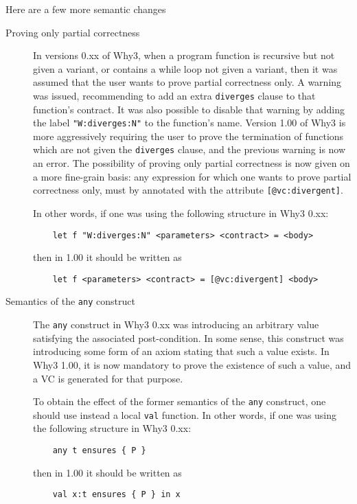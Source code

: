 \documentclass[a4paper,11pt,twoside,openright]{memoir}
\begin{document}
Here are a few more semantic changes
\begin{description}
\item[Proving only partial correctness] In versions 0.xx of Why3, when
  a program function is recursive but not given a variant, or contains
  a while loop not given a variant, then it was assumed that the user
  wants to prove partial correctness only. A warning was issued,
  recommending to add an extra \verb|diverges| clause to that
  function's contract. It was also possible to disable that warning by
  adding the label \verb|"W:diverges:N"| to the function's
  name. Version 1.00 of Why3 is more aggressively requiring the user
  to prove the termination of functions which are not given the
  \verb|diverges| clause, and the previous warning is now an
  error. The possibility of proving only partial correctness is now
  given on a more fine-grain basis: any expression for which one wants
  to prove partial correctness only, must by annotated with the
  attribute \verb|[@vc:divergent]|.

  In other words, if one was using the following structure in Why3 0.xx:
  \begin{lstlisting}
    let f "W:diverges:N" <parameters> <contract> = <body>
  \end{lstlisting}
  then in 1.00 it should be written as
  \begin{lstlisting}
    let f <parameters> <contract> = [@vc:divergent] <body>
  \end{lstlisting}
\item[Semantics of the \texttt{any} construct] The \verb|any| construct
  in Why3 0.xx was introducing an arbitrary value satisfying the
  associated post-condition. In some sense, this construct was
  introducing some form of an axiom stating that such a value
  exists. In Why3 1.00, it is now mandatory to prove the existence of
  such a value, and a VC is generated for that purpose.

  To obtain the effect of the former semantics of the \verb|any| construct, one should use instead a local \verb|val| function. In other words, if one was using the following structure in Why3 0.xx:
  \begin{lstlisting}
    any t ensures { P }
  \end{lstlisting}
  then in 1.00 it should be written as
  \begin{lstlisting}
    val x:t ensures { P } in x
  \end{lstlisting}


\end{description}
\end{document}
